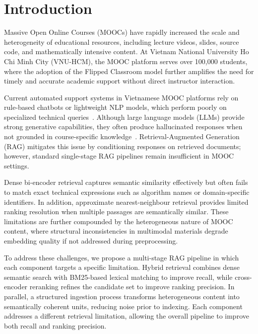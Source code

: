 \documentclass[runningheads]{llncs}
\begin{document}

\section{Introduction}

Massive Open Online Courses (MOOCs) have rapidly increased the scale and heterogeneity of educational resources, including lecture videos, slides, source code, and mathematically intensive content. At Vietnam National University Ho Chi Minh City (VNU-HCM), the MOOC platform serves over 100,000 students, where the adoption of the Flipped Classroom model further amplifies the need for timely and accurate academic support without direct instructor interaction.

Current automated support systems in Vietnamese MOOC platforms rely on rule-based chatbots or lightweight NLP models, which perform poorly on specialized technical queries~\cite{lewis2020rag}. Although large language models (LLMs) provide strong generative capabilities, they often produce hallucinated responses when not grounded in course-specific knowledge~\cite{gao2023survey}. Retrieval-Augmented Generation (RAG) mitigates this issue by conditioning responses on retrieved documents; however, standard single-stage RAG pipelines remain insufficient in MOOC settings.

Dense bi-encoder retrieval captures semantic similarity effectively but often fails to match exact technical expressions such as algorithm names or domain-specific identifiers. In addition, approximate nearest-neighbour retrieval provides limited ranking resolution when multiple passages are semantically similar. These limitations are further compounded by the heterogeneous nature of MOOC content, where structural inconsistencies in multimodal materials degrade embedding quality if not addressed during preprocessing.

To address these challenges, we propose a multi-stage RAG pipeline in which each component targets a specific limitation. Hybrid retrieval combines dense semantic search with BM25-based lexical matching to improve recall, while cross-encoder reranking refines the candidate set to improve ranking precision. In parallel, a structured ingestion process transforms heterogeneous content into semantically coherent units, reducing noise prior to indexing. Each component addresses a different retrieval limitation, allowing the overall pipeline to improve both recall and ranking precision.
\end{document}
